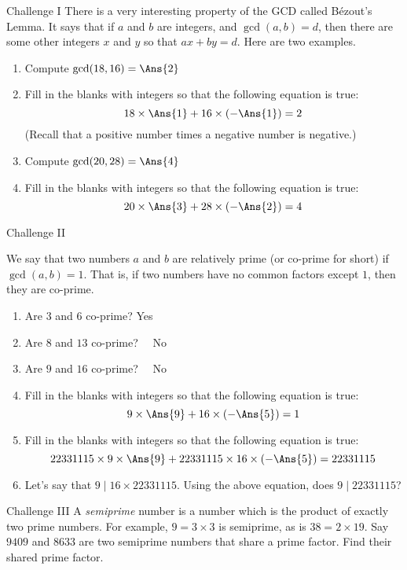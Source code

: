 \documentclass[12pt,letterpaper]{article}
\begin{document}
\begin{problem}{Challenge I}
 There is a very interesting property of the GCD called B\'ezout's Lemma. It
 says that if $a$ and $b$ are integers, and $\gcd(a, b) = d$, then there are
 some other integers $x$ and $y$ so that $ax + by = d$. Here are two examples.

 \begin{enumerate}
  \item Compute $\gcd(18, 16) = \Ans{2}$
  \item Fill in the blanks with integers so that the following equation is true:
  \[ 18 \times \Ans{1} + 16 \times (- \Ans{1}) = 2 \]
  (Recall that a positive number times a negative number is negative.)
  \item Compute $\gcd(20, 28) = \Ans{4}$
  \item Fill in the blanks with integers so that the following equation is true:
  \[ 20 \times \Ans{3} + 28 \times (- \Ans{2}) = 4 \]
 \end{enumerate}
\end{problem}

\begin{problem}{Challenge II}

 We say that two numbers $a$ and $b$ are relatively prime (or co-prime for
 short) if $\gcd(a, b) = 1$. That is, if two numbers have no common factors
 except $1$, then they are co-prime.

 \begin{enumerate}
  \item Are $3$ and $6$ co-prime?  \hfill Yes~~
  \item Are $8$ and $13$ co-prime? \hfill {}~~No
  \item Are $9$ and $16$ co-prime? \hfill {}~~No
  \item Fill in the blanks with integers so that the following equation is true:
  \[ 9 \times \Ans{9} + 16 \times (-\Ans{5}) = 1 \]
  \item Fill in the blanks with integers so that the following equation is true:
  \[ 22331115 \times 9 \times \Ans{9} + 22331115 \times 16 \times (-\Ans{5}) =
  22331115 \]
  \item Let's say that $9 \mid 16\times22331115$. Using the above equation,
  does $9\mid22331115$? 
 \end{enumerate}
\end{problem}

\begin{problem}{Challenge III}
 A \emph{semiprime} number is a number which is the product of exactly two prime
 numbers. For example, $9=3\times3$ is semiprime, as is $38=2\times19$. Say
 $9409$ and $8633$ are two semiprime numbers that share a prime factor. Find
 their shared prime factor. 
\end{problem}
\end{document}
